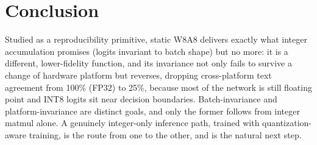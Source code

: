 \documentclass[wcp]{jmlr}
\begin{document}
\section{Conclusion}
Studied as a reproducibility primitive, static W8A8 delivers exactly what integer
accumulation promises (logits invariant to batch shape) but no more: it is a
different, lower-fidelity function, and its invariance not only fails to survive a
change of hardware platform but reverses, dropping cross-platform text agreement from
100\% (FP32) to 25\%, because most of the network is still floating point and INT8
logits sit near decision boundaries. Batch-invariance and platform-invariance are
distinct goals, and only the former follows from integer matmul alone. A genuinely
integer-only inference path, trained with quantization-aware training, is the route
from one to the other, and is the natural next step.


\end{document}
